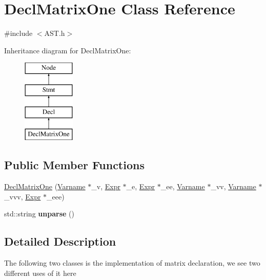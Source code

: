 \hypertarget{classDeclMatrixOne}{\section{Decl\-Matrix\-One Class Reference}
\label{classDeclMatrixOne}
}


{\ttfamily \#include $<$A\-S\-T.\-h$>$}

Inheritance diagram for Decl\-Matrix\-One\-:\begin{figure}[H]
\begin{center}
\leavevmode
\includegraphics[height=4.000000cm]{classDeclMatrixOne}
\end{center}
\end{figure}
\subsection*{Public Member Functions}
\begin{DoxyCompactItemize}
\item 
\hyperlink{classDeclMatrixOne_aefcbacd4cde0d61d71be293a3ebdff3e}{Decl\-Matrix\-One} (\hyperlink{classVarname}{Varname} $\ast$\-\_\-v, \hyperlink{classExpr}{Expr} $\ast$\-\_\-e, \hyperlink{classExpr}{Expr} $\ast$\-\_\-ee, \hyperlink{classVarname}{Varname} $\ast$\-\_\-vv, \hyperlink{classVarname}{Varname} $\ast$\-\_\-vvv, \hyperlink{classExpr}{Expr} $\ast$\-\_\-eee)
\item 
\hypertarget{classDeclMatrixOne_a4f1a82118dae53dc118cfedb0958c3b5}{std\-::string {\bfseries unparse} ()}\label{classDeclMatrixOne_a4f1a82118dae53dc118cfedb0958c3b5}

\end{DoxyCompactItemize}


\subsection{Detailed Description}
The following two classes is the implementation of matrix declaration, we see two different uses of it here 

